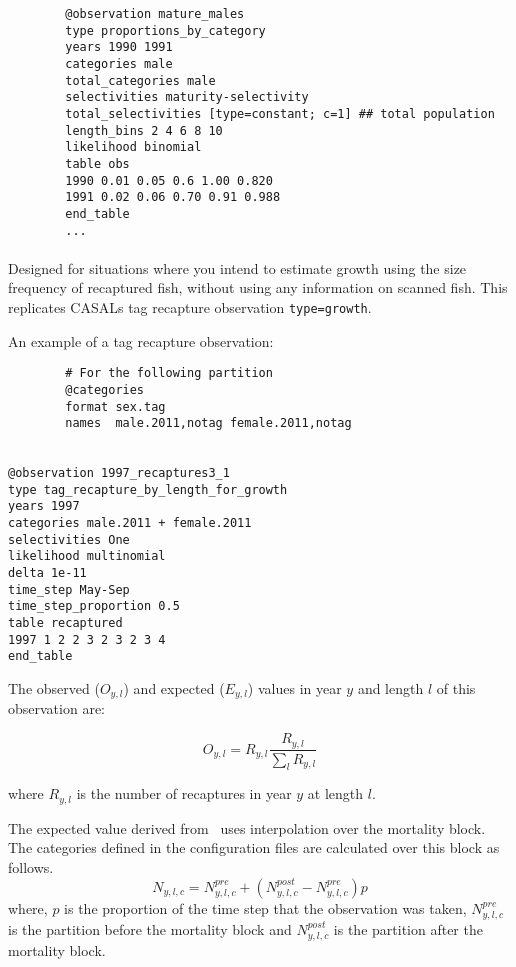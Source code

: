 {\small{\begin{verbatim}
		@observation mature_males
		type proportions_by_category
		years 1990 1991
		categories male
		total_categories male
		selectivities maturity-selectivity
		total_selectivities [type=constant; c=1] ## total population
		length_bins 2 4 6 8 10 
		likelihood binomial
		table obs
		1990 0.01 0.05 0.6 1.00 0.820
		1991 0.02 0.06 0.70 0.91 0.988
		end_table
		...
		\end{verbatim}}}

\paragraph*{\label{sec:Observation-TagRecaptureByLengthForGrowth}}
Designed for situations where you intend to estimate growth using the size frequency of recaptured fish, without using any information on scanned fish. This replicates CASALs tag recapture observation \texttt{type=growth}. 
 
An example of a tag recapture observation:

{\small{\begin{verbatim}
		# For the following partition
		@categories
		format sex.tag
		names  male.2011,notag female.2011,notag
		

@observation 1997_recaptures3_1
type tag_recapture_by_length_for_growth
years 1997
categories male.2011 + female.2011
selectivities One
likelihood multinomial
delta 1e-11
time_step May-Sep
time_step_proportion 0.5
table recaptured
1997 1 2 2 3 2 3 2 3 4
end_table
\end{verbatim}}}

The observed ($O_{y,l}$) and expected ($E_{y,l}$) values in year $y$ and length $l$ of this observation are:

\begin{equation}
O_{y,l} = R_{y,l} \frac{R_{y,l}}{\sum_l R_{y,l}}
\end{equation}

where $R_{y,l}$ is the number of recaptures in year $y$ at length $l$.

The expected value derived from \CNAME\ uses interpolation over the mortality block. The categories defined in the configuration files are calculated over this block as follows.
\begin{equation}
N_{y,l,c} = N^{pre}_{y,l,c} +   (N^{post}_{y,l,c} - N^{pre}_{y,l,c})p
\end{equation}
where, $p$ is the proportion of the time step that the observation was taken, \(N^{pre}_{y,l,c}\) is the partition before the mortality block and \(N^{post}_{y,l,c}\) is the partition after the mortality block.

